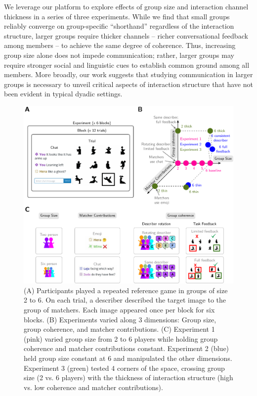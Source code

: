 \documentclass[9pt,twocolumn,twoside]{pnas-new}
\begin{document}
We leverage our platform to explore effects of group size and
interaction channel thickness in a series of three experiments. While we
find that small groups reliably converge on group-specific ``shorthand''
regardless of the interaction structure, larger groups require thicker
channels -- richer conversational feedback among members -- to achieve
the same degree of coherence. Thus, increasing group size alone does not
impede communication; rather, larger groups may require stronger social
and linguistic cues to establish common ground among all members. More
broadly, our work suggests that studying communication in larger groups
is necessary to unveil critical aspects of interaction structure that
have not been evident in typical dyadic settings.

\begin{figure}[t!]

{\centering \includegraphics[width=1\linewidth]{expt-diagram4.pdf} 

}

\caption{(A) Participants played a repeated reference game in groups of size 2 to 6. On each trial, a describer described the target image to the group of matchers. Each image appeared once per block for six blocks. (B) Experiments varied along 3 dimensions: Group size, group coherence, and matcher contributions. (C) Experiment 1 (pink) varied group size from 2 to 6 players while holding group coherence and matcher contributions constant. Experiment 2 (blue) held group size constant at 6 and manipulated the other dimensions. Experiment 3 (green) tested 4 corners of the space, crossing group size (2 vs. 6 players) with the thickness of interaction structure (high vs. low coherence and matcher contributions).}
\end{figure}
\end{document}

